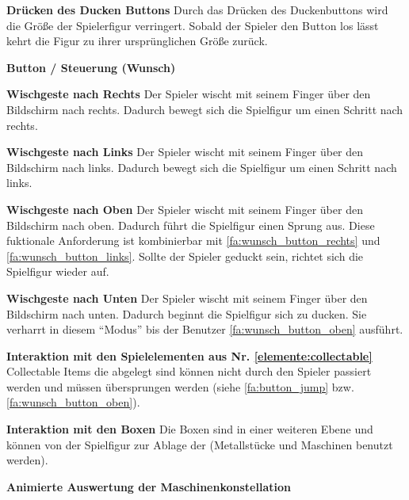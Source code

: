 \documentclass{scrartcl}
\begin{document}
\begin{falist}[resume]
\begin{falist}
    	\item \label{fa:button_ducken} \textbf{Drücken des Ducken Buttons} Durch das Drücken des Duckenbuttons wird die Größe der Spielerfigur verringert. Sobald der Spieler den Button los lässt kehrt die Figur zu ihrer ursprünglichen Größe zurück.
    \end{falist}
    \item \label{fa:button_wunsch} \textbf{Button / Steuerung (Wunsch)}
    \begin{falist}
    	\item \label{fa:wunsch_button_rechts} \textbf{Wischgeste nach Rechts} Der Spieler wischt mit seinem Finger über den Bildschirm nach rechts. Dadurch bewegt sich die Spielfigur um einen Schritt nach rechts.
    	\item \label{fa:wunsch_button_links} \textbf{Wischgeste nach Links} Der Spieler wischt mit seinem Finger über den Bildschirm nach links. Dadurch bewegt sich die Spielfigur um einen Schritt nach links.
    	\item \label{fa:wunsch_button_oben} \textbf{Wischgeste nach Oben} Der Spieler wischt mit seinem Finger über den Bildschirm nach oben. Dadurch führt die Spielfigur einen Sprung aus. Diese fuktionale Anforderung ist kombinierbar mit \ref{fa:wunsch_button_rechts} und \ref{fa:wunsch_button_links}. Sollte der Spieler geduckt sein, richtet sich die Spielfigur wieder auf.
    	\item \label{fa:wunsch_button_unten} \textbf{Wischgeste nach Unten} Der Spieler wischt mit seinem Finger über den Bildschirm nach unten. Dadurch beginnt die Spielfigur sich zu ducken. Sie verharrt in diesem \enquote{Modus} bis der Benutzer \ref{fa:wunsch_button_oben} ausführt.
    \end{falist}
	\item \textbf{Interaktion mit den Spielelementen aus Nr. \ref{elemente:collectable}} Collectable Items die abgelegt sind können nicht durch den Spieler passiert werden und müssen übersprungen werden (siehe \ref{fa:button_jump} bzw. \ref{fa:wunsch_button_oben}).
	\item \textbf{Interaktion mit den Boxen} Die Boxen sind in einer weiteren Ebene und können von der Spielfigur zur Ablage der (Metallstücke und Maschinen benutzt werden).
	\item \label{fa:auswertung_animiert} \textbf{Animierte Auswertung der Maschinenkonstellation}
	\begin{falist}
		\item 
	\end{falist}
\end{falist}
\end{document}
